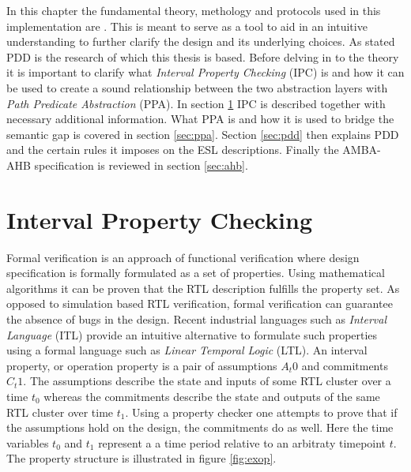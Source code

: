 \label{ch:theory}

In this chapter\TLINS{,}  the fundamental theory, methology and protocols used in this implementation are . This is meant to serve as a tool to aid in an intuitive understanding to further clarify the design and its underlying choices. As stated PDD is the research of which this thesis is based.  Before delving in to the theory it is important to clarify what \textit{Interval Property Checking} (IPC) is and how it can be used to create a sound relationship between the two abstraction layers with \textit{Path Predicate Abstraction} (PPA). In   section \ref{sec:ipc} IPC is described together with necessary additional information. What PPA is and how it is used to bridge the semantic gap is covered in section \ref{sec:ppa}. Section \ref{sec:pdd} then explains PDD and the certain rules it imposes on the ESL descriptions. Finally the AMBA-AHB specification is reviewed in section \ref{sec:ahb}.       


\section{Interval Property Checking}
\label{sec:ipc}
Formal verification is an approach of functional verification where design specification is formally formulated as a set of properties. Using mathematical algorithms    it can be proven that the RTL description fulfills the property set. As opposed to simulation based RTL verification, formal verification can guarantee the absence of bugs in the design. Recent industrial languages such as \textit{Interval Language} (ITL) provide an intuitive alternative to formulate such properties using a formal language such as \textit{Linear Temporal Logic} (LTL). An interval property, or operation property    is a pair of assumptions $A_t0$ and commitments $C_t1$. The assumptions describe the state and inputs of some RTL cluster over a time $t_0$ whereas the commitments describe the state and outputs of the same RTL cluster over time $t_1$. Using a property checker one attempts to prove that if the assumptions hold on the design, the commitments do as well. Here the time variables $t_0$ and $t_1$ represent a a time period relative to an arbitraty timepoint $t$. The property structure is illustrated in figure \ref{fig:exop}.  

